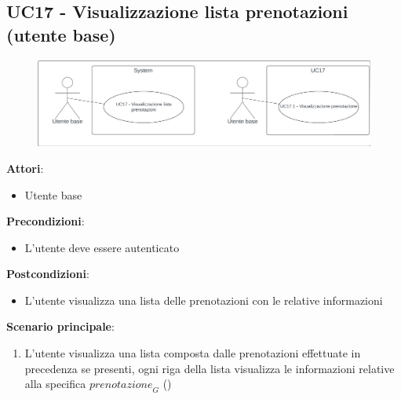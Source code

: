 \subsection{UC17 - Visualizzazione lista prenotazioni (utente base)} \label{usecase:17}
\begin{figure}[H]
  \centering
  \includegraphics[width=1\textwidth]{ucd/UCD17.png}
\end{figure}
\textbf{Attori}:
\begin{itemize}
    \item Utente base
\end{itemize}
\textbf{Precondizioni}:
\begin{itemize}
    \item L'utente deve essere autenticato
\end{itemize}
\textbf{Postcondizioni}:
\begin{itemize}
    \item L'utente visualizza una lista delle prenotazioni con le relative informazioni
\end{itemize}
\textbf{Scenario principale}:
\begin{enumerate}
    \item L'utente visualizza una lista composta dalle prenotazioni effettuate in precedenza se presenti, ogni riga della lista visualizza le informazioni relative alla specifica $\textit{prenotazione}_G$ ()
\end{enumerate}

